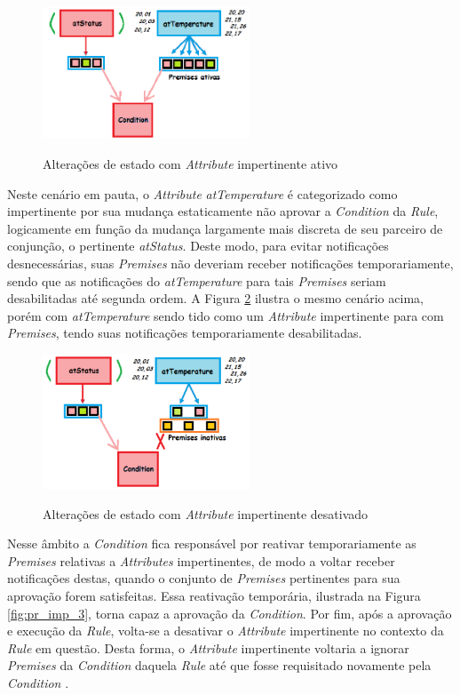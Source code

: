 \begin{figure}[!htb]
  \centering
  \caption{Alterações de estado com \textit{Attribute} impertinente ativo}
  \includegraphics[width=0.55\textwidth]{../figures/pr_imp_1.png}
  \smallskip
  \label{fig:pr_imp_1}
\end{figure}

Neste cenário em pauta, o \textit{Attribute} \textit{atTemperature} é
categorizado como impertinente por sua mudança estaticamente não aprovar a
\textit{Condition} da \textit{Rule}, logicamente em função da mudança largamente
mais discreta de seu parceiro de conjunção, o pertinente \textit{atStatus}.
Deste modo, para evitar notificações desnecessárias, suas \textit{Premises} não
deveriam receber notificações temporariamente, sendo que as notificações do
\textit{atTemperature} para tais \textit{Premises} seriam desabilitadas até
segunda ordem. A Figura \ref{fig:pr_imp_2} ilustra o mesmo cenário acima, porém
com \textit{atTemperature} sendo tido como um \textit{Attribute} impertinente
para com \textit{Premises}, tendo suas notificações temporariamente
desabilitadas.

\begin{figure}[!htb]
  \centering
  \caption{Alterações de estado com \textit{Attribute} impertinente desativado}
  \includegraphics[width=0.55\textwidth]{../figures/pr_imp_2.png}
  \smallskip
  \label{fig:pr_imp_2}
\end{figure}


Nesse âmbito a \textit{Condition} fica responsável por reativar temporariamente
as \textit{Premises} relativas a \textit{Attributes} impertinentes, de modo a
voltar receber notificações destas, quando o conjunto de \textit{Premises}
pertinentes para sua aprovação forem satisfeitas. Essa reativação temporária,
ilustrada na Figura \ref{fig:pr_imp_3}, torna capaz a aprovação da
\textit{Condition}. Por fim, após a aprovação e execução da \textit{Rule},
volta-se a desativar o \textit{Attribute} impertinente no contexto da
\textit{Rule} em questão. Desta forma, o \textit{Attribute} impertinente
voltaria a ignorar \textit{Premises} da \textit{Condition} daquela \textit{Rule}
até que fosse requisitado novamente pela \textit{Condition}
\cite{msc_Ronszcka_2012}.

